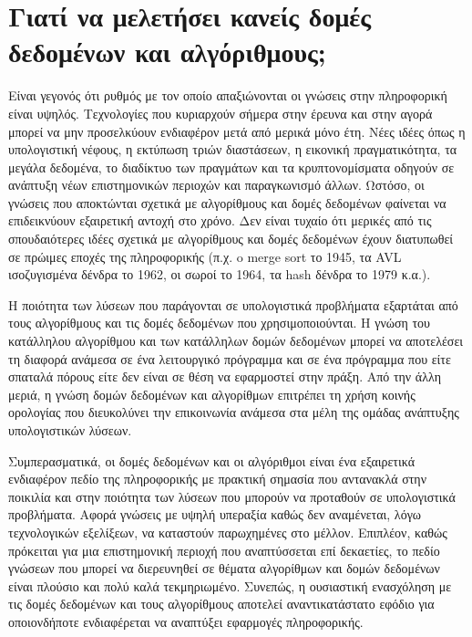 \section*{Γιατί να μελετήσει κανείς δομές δεδομένων και αλγόριθμους;}
Είναι γεγονός ότι ρυθμός με τον οποίο απαξιώνονται οι γνώσεις στην πληροφορική είναι υψηλός. Τεχνολογίες που κυριαρχούν σήμερα στην έρευνα και στην αγορά μπορεί να μην προσελκύουν ενδιαφέρον μετά από μερικά μόνο έτη. Νέες ιδέες όπως η υπολογιστική νέφους, η εκτύπωση τριών διαστάσεων, η εικονική πραγματικότητα, τα μεγάλα δεδομένα, το διαδίκτυο των πραγμάτων και τα κρυπτονομίσματα οδηγούν σε ανάπτυξη νέων επιστημονικών περιοχών και παραγκωνισμό άλλων. Ωστόσο, οι γνώσεις που αποκτώνται σχετικά με αλγορίθμους και δομές δεδομένων φαίνεται να επιδεικνύουν εξαιρετική αντοχή στο χρόνο. Δεν είναι τυχαίο ότι μερικές από τις σπουδαιότερες ιδέες σχετικά με αλγορίθμους και δομές δεδομένων έχουν διατυπωθεί σε πρώιμες εποχές της πληροφορικής (π.χ. o merge sort το 1945, τα AVL ισοζυγισμένα δένδρα το 1962, οι σωροί το 1964, τα hash δένδρα το 1979 κ.α.).

Η ποιότητα των λύσεων που παράγονται σε υπολογιστικά προβλήματα εξαρτάται από τους αλγορίθμους και τις δομές δεδομένων που χρησιμοποιούνται. Η γνώση του κατάλληλου αλγορίθμου και των κατάλληλων δομών δεδομένων μπορεί να αποτελέσει τη διαφορά ανάμεσα σε ένα λειτουργικό πρόγραμμα και σε ένα πρόγραμμα που είτε σπαταλά πόρους είτε δεν είναι σε θέση να εφαρμοστεί στην πράξη. Από την άλλη μεριά, η γνώση δομών δεδομένων και αλγορίθμων επιτρέπει τη χρήση κοινής ορολογίας που διευκολύνει την επικοινωνία ανάμεσα στα μέλη της ομάδας ανάπτυξης υπολογιστικών λύσεων. 

Συμπερασματικά, οι δομές δεδομένων και οι αλγόριθμοι είναι ένα εξαιρετικά ενδιαφέρον πεδίο της πληροφορικής με πρακτική σημασία που αντανακλά στην ποικιλία και στην ποιότητα των λύσεων που μπορούν να προταθούν σε υπολογιστικά προβλήματα. Αφορά γνώσεις με υψηλή υπεραξία καθώς δεν αναμένεται, λόγω τεχνολογικών εξελίξεων, να καταστούν παρωχημένες στο μέλλον. Επιπλέον, καθώς πρόκειται για μια επιστημονική περιοχή που αναπτύσσεται επί δεκαετίες, το πεδίο γνώσεων που μπορεί να διερευνηθεί σε θέματα αλγορίθμων και δομών δεδομένων είναι πλούσιο και πολύ καλά τεκμηριωμένο. Συνεπώς, η ουσιαστική ενασχόληση με τις δομές δεδομένων και τους αλγορίθμους αποτελεί αναντικατάστατο εφόδιο για οποιονδήποτε ενδιαφέρεται να αναπτύξει εφαρμογές πληροφορικής. 
